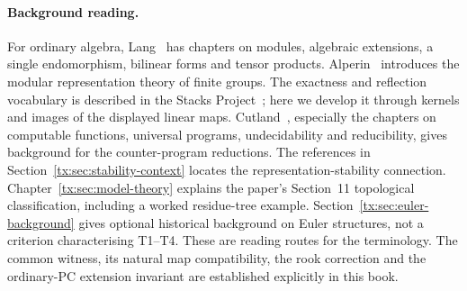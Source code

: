 \paragraph{Background reading.}
For ordinary algebra, Lang~\cite{LangAlgebra} has chapters on
modules, algebraic extensions, a single endomorphism, bilinear forms
and tensor products. Alperin~\cite{AlperinLocal} introduces the modular
representation theory of finite groups. The exactness and reflection
vocabulary is described in the Stacks Project~\cite{StacksExact}; here
we develop it through kernels and images of the displayed linear maps.
Cutland~\cite{Cutland}, especially the chapters on computable functions,
universal programs, undecidability and reducibility, gives background
for the counter-program reductions. The references in
Section~\ref{tx:sec:stability-context} locates the representation-stability
connection. Chapter~\ref{tx:sec:model-theory} explains the paper's
Section~11 topological classification, including a worked residue-tree
example. Section~\ref{tx:sec:euler-background} gives optional historical
background on Euler structures, not a criterion characterising T1--T4.
These are reading routes for the terminology. The common witness,
its natural map compatibility, the rook correction and the ordinary-PC
extension invariant are established explicitly in this book.

